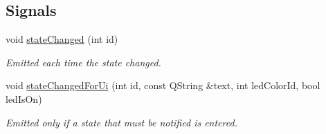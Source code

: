 \subsection*{Signals}
\begin{DoxyCompactItemize}
\item 
void \hyperlink{classmdt_state_machine_a57952ce2e02e44a57c70695067dc8b86}{state\-Changed} (int id)
\begin{DoxyCompactList}\small\item\em Emitted each time the state changed. \end{DoxyCompactList}\item 
void \hyperlink{classmdt_state_machine_a3ff507d3d9256107038ceb0c3dfba9c8}{state\-Changed\-For\-Ui} (int id, const Q\-String \&text, int led\-Color\-Id, bool led\-Is\-On)
\begin{DoxyCompactList}\small\item\em Emitted only if a state that must be notified is entered. \end{DoxyCompactList}\end{DoxyCompactItemize}
